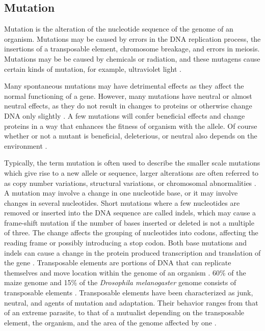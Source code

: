 \subsection{Mutation}
\label{sec:Mutation}

Mutation is the alteration of the nucleotide sequence of the genome of an organism.
Mutations may be caused by errors in the DNA replication process, the insertions of a transposable element, chromosome breakage, and errors in meiosis.
Mutations may be be caused by chemicals or radiation, and these mutagens cause certain kinds of mutation, for example, ultraviolet light \parencite{Kozmin2005}.

Many spontaneous mutations may have detrimental effects as they affect the normal functioning of a gene.
However, many mutations have neutral or almost neutral effects, as they do not result in changes to proteins or otherwise change DNA only slightly \parencite{Grauer2000}.
A few mutations will confer beneficial effects and change proteins in a way that enhances the fitness of organism with the allele.
Of course whether or not a mutant is beneficial, deleterious, or neutral also depends on the environment \parencite{Grauer2000}.

Typically, the term mutation is often used to describe the smaller scale mutations which give rise to a new allele or sequence, larger alterations are often referred to as copy number variations, structural variations, or chromosomal abnormalities \parencite{Grauer2000,Hedrick2010}.
A mutation may involve a change in one nucleotide base, or it may involve changes in several nucleotides.
Short mutations where a few nucleotides are removed or inserted into the DNA sequence are called indels, which may cause a frame-shift mutation if the number of bases inserted or deleted is not a multiple of three.
The change affects the grouping of nucleotides into codons, affecting the reading frame or possibly introducing a stop codon.
Both base mutations and indels can cause a change in the protein produced transcription and translation of the gene \parencite{Grauer2000}.
Transposable elements are portions of DNA that can replicate themselves and move location within the genome of an organism \parencite{Grauer2000,Wicker2007}.
60\% of the maize genome and 15\% of the \textit{Drosophila melanogaster} genome consists of transposable elements \parencite{Biemont2006}.
Transposable elements have been characterized as junk, neutral, and agents of mutation and adaptation. Their behavior ranges from that of an extreme parasite, to that of a mutualist depending on the transposable element, the organism, and the area of the genome affected by one \parencite{Grauer2000}.


